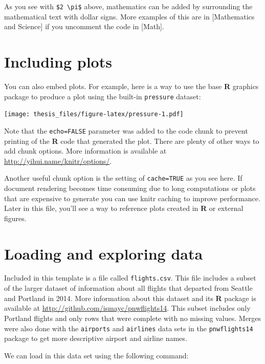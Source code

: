 \documentclass[12pt,twoside]{reedthesis}
\theoremstyle{definition}
\theoremstyle{definition}
\theoremstyle{remark}
\begin{document}
  As you see with \texttt{\$2\ \textbackslash{}pi\$} above, mathematics
  can be added by surrounding the mathematical text with dollar signs.
  More examples of this are in {[}Mathematics and Science{]} if you
  uncomment the code in {[}Math{]}.
  
  \section{Including plots}\label{including-plots}
  
  You can also embed plots. For example, here is a way to use the base
  \textbf{R} graphics package to produce a plot using the built-in
  \texttt{pressure} dataset:
  
  \texttt{[image: thesis\_files/figure-latex/pressure-1.pdf]}
  
  Note that the \texttt{echo=FALSE} parameter was added to the code chunk
  to prevent printing of the \textbf{R} code that generated the plot.
  There are plenty of other ways to add chunk options. More information is
  available at \url{http://yihui.name/knitr/options/}.
  
  Another useful chunk option is the setting of \texttt{cache=TRUE} as you
  see here. If document rendering becomes time consuming due to long
  computations or plots that are expensive to generate you can use knitr
  caching to improve performance. Later in this file, you'll see a way to
  reference plots created in \textbf{R} or external figures.
  
  \hypertarget{loading-and-exploring-data}{\section{Loading and exploring
  data}\label{loading-and-exploring-data}}
  
  Included in this template is a file called \texttt{flights.csv}. This
  file includes a subset of the larger dataset of information about all
  flights that departed from Seattle and Portland in 2014. More
  information about this dataset and its \textbf{R} package is available
  at \url{http://github.com/ismayc/pnwflights14}. This subset includes
  only Portland flights and only rows that were complete with no missing
  values. Merges were also done with the \texttt{airports} and
  \texttt{airlines} data sets in the \texttt{pnwflights14} package to get
  more descriptive airport and airline names.
  
  We can load in this data set using the following command:
  
\end{document}
